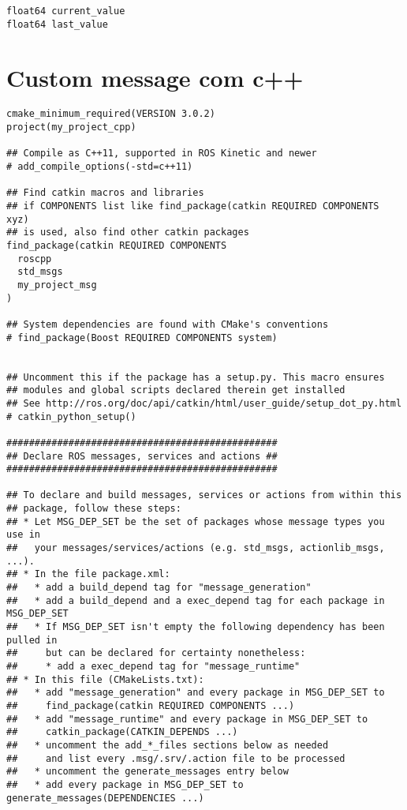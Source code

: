 \documentclass[letterpaper]{article}
\begin{document}
\begin{lstlisting}[style=xmlstyle, title=src/my\_project\_msg/msg/CounterHistory.msg]
float64 current_value
float64 last_value
\end{lstlisting}

\section{Custom message com c++}
\begin{lstlisting}[style=xmlstyle, title=src/my\_project\_cpp/CMakeLists.txt] 
cmake_minimum_required(VERSION 3.0.2)
project(my_project_cpp)

## Compile as C++11, supported in ROS Kinetic and newer
# add_compile_options(-std=c++11)

## Find catkin macros and libraries
## if COMPONENTS list like find_package(catkin REQUIRED COMPONENTS xyz)
## is used, also find other catkin packages
find_package(catkin REQUIRED COMPONENTS
  roscpp
  std_msgs
  my_project_msg
)

## System dependencies are found with CMake's conventions
# find_package(Boost REQUIRED COMPONENTS system)


## Uncomment this if the package has a setup.py. This macro ensures
## modules and global scripts declared therein get installed
## See http://ros.org/doc/api/catkin/html/user_guide/setup_dot_py.html
# catkin_python_setup()

################################################
## Declare ROS messages, services and actions ##
################################################

## To declare and build messages, services or actions from within this
## package, follow these steps:
## * Let MSG_DEP_SET be the set of packages whose message types you use in
##   your messages/services/actions (e.g. std_msgs, actionlib_msgs, ...).
## * In the file package.xml:
##   * add a build_depend tag for "message_generation"
##   * add a build_depend and a exec_depend tag for each package in MSG_DEP_SET
##   * If MSG_DEP_SET isn't empty the following dependency has been pulled in
##     but can be declared for certainty nonetheless:
##     * add a exec_depend tag for "message_runtime"
## * In this file (CMakeLists.txt):
##   * add "message_generation" and every package in MSG_DEP_SET to
##     find_package(catkin REQUIRED COMPONENTS ...)
##   * add "message_runtime" and every package in MSG_DEP_SET to
##     catkin_package(CATKIN_DEPENDS ...)
##   * uncomment the add_*_files sections below as needed
##     and list every .msg/.srv/.action file to be processed
##   * uncomment the generate_messages entry below
##   * add every package in MSG_DEP_SET to generate_messages(DEPENDENCIES ...)


\end{lstlisting}
\end{document}
